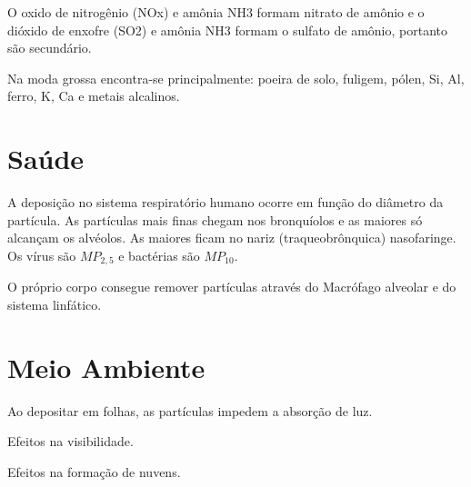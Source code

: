 O oxido de nitrogênio (NOx) e amônia NH3 formam  nitrato de amônio e 
o dióxido de enxofre (SO2) e amônia NH3 formam o sulfato de amônio, 
portanto são secundário. 

Na moda grossa encontra-se principalmente: poeira de solo, fuligem, 
pólen, Si, Al, ferro, K, Ca e metais alcalinos.

\section{Saúde}

A deposição no sistema respiratório humano ocorre em função do diâmetro da partícula.
As partículas mais finas chegam nos bronquíolos e as maiores só alcançam os alvéolos.
As maiores ficam no nariz (traqueobrônquica) nasofaringe. 
Os vírus são $MP_{2,5}$ e bactérias são $MP_{10}$. 

O próprio corpo consegue remover partículas através do Macrófago alveolar 
e do sistema linfático. 

\section{Meio Ambiente}
Ao depositar em folhas, as partículas impedem a absorção de luz. 

Efeitos na visibilidade.

Efeitos na formação de nuvens.


